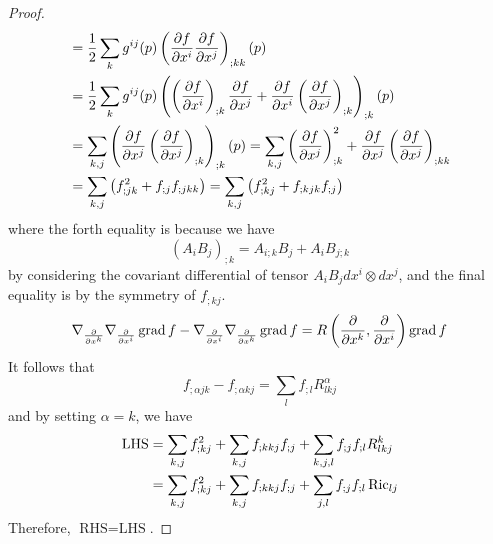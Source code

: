 \begin{enumerate}[label=\arabic{*}.]
\begin{proof}
\begin{equation*}
\begin{aligned}
				&=\frac{1}{2}\sum_kg^{ij}(p)\left(\frac{\partial f}{\partial x^i}\frac{\partial f}{\partial x^j}\right)_{;kk}(p) \\
				&=\frac{1}{2}\sum_kg^{ij}(p)\left(\left(\frac{\partial f}{\partial x^i}\right)_{;k}\frac{\partial f}{\partial x^j} + \frac{\partial f}{\partial x^i}\left(\frac{\partial f}{\partial x^j}\right)_{;k}\right)_{;k}(p) \\
				&=  \sum_{k,j} \left(\frac{\partial f}{\partial x^j}\left(\frac{\partial f}{\partial x^j}\right)_{;k}\right)_{;k}(p) = \sum_{k,j} \left(\frac{\partial f}{\partial x^j}\right)_{;k}^2 + \frac{\partial f}{\partial x^j}\left(\frac{\partial f}{\partial x^j}\right)_{;kk} \\
				&= \sum_{k,j} \left(f_{;jk}^2 + f_{;j}f_{;jkk}\right) = \sum_{k,j} \left(f_{;kj}^2 + f_{;kjk}f_{;j}\right)
			\end{aligned}
		\end{equation*}
		where the forth equality is because we have
		\begin{equation*}
			(A_iB_j)_{;k} = A_{i;k}B_j + A_iB_{j;k}
		\end{equation*}
		by considering the covariant differential of tensor $A_iB_jdx^i\otimes dx^j$, and the final equality is by the symmetry of $f_{;kj}$.
		\begin{equation*}
			\nabla_{\frac{\partial}{\partial x^k}}\nabla_{\frac{\partial}{\partial x^i}}\operatorname{grad}f - \nabla_{\frac{\partial}{\partial x^i}}\nabla_{\frac{\partial}{\partial x^k}}\operatorname{grad}f = R\left(\frac{\partial}{\partial x^k},\frac{\partial}{\partial x^i}\right)\operatorname{grad}f
		\end{equation*}
		It follows that
		\begin{equation*}
			f_{;\alpha jk} - f_{;\alpha kj} = \sum_l f_{;l}R^\alpha_{lkj}
		\end{equation*}
		and by setting $\alpha = k$, we have
		\begin{equation*}
			\begin{aligned}
				\text{LHS} &= \sum_{k,j}f_{;kj}^2 + \sum_{k,j}f_{;kkj}f_{;j} + \sum_{k,j,l}f_{;j}f_{;l}R^k_{lkj} \\
				&= \sum_{k,j}f_{;kj}^2 + \sum_{k,j}f_{;kkj}f_{;j} + \sum_{j,l}f_{;j}f_{;l}\operatorname{Ric}_{lj} \\
			\end{aligned}
		\end{equation*}
		Therefore, $\text{RHS} = \text{LHS}$.
	\end{proof}


\end{enumerate}
